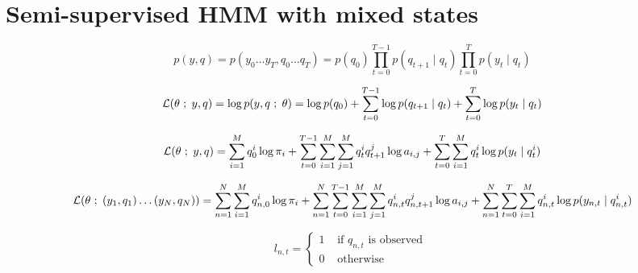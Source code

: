 \documentclass[a4paper, 11pt]{article}
\newcommand{\ssemi}{\hspace{.3em};\hspace{.3em}}
\begin{document}
\section{Semi-supervised HMM with mixed states}

\begin{displaymath}
  p(y, q) = p(y_0 \dots y_T, q_0 \dots q_T) = p(q_0) \prod_{t = 0}^{T-1} p(q_{t+1} \mid q_t) \prod_{t = 0}^{T} p(y_t \mid q_t)
\end{displaymath}

\begin{displaymath}
  \mathcal{L}(\theta \ssemi y, q) = \log{p(y, q \ssemi \theta)} = \log{p(q_0)} + \sum_{t = 0}^{T-1} \log{p(q_{t+1} \mid q_t)} + \sum_{t = 0}^{T} \log{ p(y_t \mid q_t) }
\end{displaymath}

\begin{displaymath}
  \mathcal{L}(\theta \ssemi y, q) = \sum_{i = 1}^{M} q_0^i \log{\pi_i} + \sum_{t = 0}^{T-1} \sum_{i = 1}^{M} \sum_{j = 1}^{M} q_t^i q_{t+1}^j \log{a_{i,j}} + \sum_{t = 0}^{T} \sum_{i = 1}^{M} q_t^i \log{ p(y_t \mid q_t^i) }
\end{displaymath}

\begin{displaymath}
  \mathcal{L}(\theta \ssemi (y_1, q_1) \dots (y_N, q_N) ) = \sum_{n = 1}^N \sum_{i = 1}^{M} q_{n, 0}^i \log{\pi_i} + \sum_{n = 1}^N \sum_{t = 0}^{T-1} \sum_{i = 1}^{M} \sum_{j = 1}^{M} q_{n, t}^i q_{n, t+1}^j \log{a_{i,j}} + \sum_{n = 1}^N \sum_{t = 0}^{T} \sum_{i = 1}^{M} q_{n, t}^i \log{ p(y_{n, t} \mid q_{n, t}^i) }
\end{displaymath}




\begin{displaymath}
  l_{n, t} = \left\{
    \begin{array}{ll}
      1 &\text{ if $q_{n, t}$ is observed } \\
      0 &\text{ otherwise }
    \end{array}
    \right.
\end{displaymath}
\end{document}
